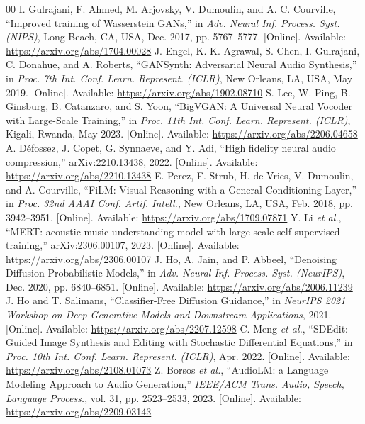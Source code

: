 \documentclass[conference]{IEEEtran}
\begin{document}
\begin{thebibliography}{00}
 I. Gulrajani, F. Ahmed, M. Arjovsky, V. Dumoulin, and A. C. Courville, ``Improved training of Wasserstein GANs,'' in \textit{Adv. Neural Inf. Process. Syst. (NIPS)}, Long Beach, CA, USA, Dec. 2017, pp. 5767--5777. [Online]. Available: \url{https://arxiv.org/abs/1704.00028}
 J. Engel, K. K. Agrawal, S. Chen, I. Gulrajani, C. Donahue, and A. Roberts, ``GANSynth: Adversarial Neural Audio Synthesis,'' in \textit{Proc. 7th Int. Conf. Learn. Represent. (ICLR)}, New Orleans, LA, USA, May 2019. [Online]. Available: \url{https://arxiv.org/abs/1902.08710}
 S. Lee, W. Ping, B. Ginsburg, B. Catanzaro, and S. Yoon, ``BigVGAN: A Universal Neural Vocoder with Large-Scale Training,'' in \textit{Proc. 11th Int. Conf. Learn. Represent. (ICLR)}, Kigali, Rwanda, May 2023. [Online]. Available: \url{https://arxiv.org/abs/2206.04658}
 A. D\'efossez, J. Copet, G. Synnaeve, and Y. Adi, ``High fidelity neural audio compression,'' arXiv:2210.13438, 2022. [Online]. Available: \url{https://arxiv.org/abs/2210.13438}
 E. Perez, F. Strub, H. de Vries, V. Dumoulin, and A. Courville, ``FiLM: Visual Reasoning with a General Conditioning Layer,'' in \textit{Proc. 32nd AAAI Conf. Artif. Intell.}, New Orleans, LA, USA, Feb. 2018, pp. 3942--3951. [Online]. Available: \url{https://arxiv.org/abs/1709.07871}
 Y. Li \textit{et al.}, ``MERT: acoustic music understanding model with large-scale self-supervised training,'' arXiv:2306.00107, 2023. [Online]. Available: \url{https://arxiv.org/abs/2306.00107}
 J. Ho, A. Jain, and P. Abbeel, ``Denoising Diffusion Probabilistic Models,'' in \textit{Adv. Neural Inf. Process. Syst. (NeurIPS)}, Dec. 2020, pp. 6840--6851. [Online]. Available: \url{https://arxiv.org/abs/2006.11239}
 J. Ho and T. Salimans, ``Classifier-Free Diffusion Guidance,'' in \textit{NeurIPS 2021 Workshop on Deep Generative Models and Downstream Applications}, 2021. [Online]. Available: \url{https://arxiv.org/abs/2207.12598}
 C. Meng \textit{et al.}, ``SDEdit: Guided Image Synthesis and Editing with Stochastic Differential Equations,'' in \textit{Proc. 10th Int. Conf. Learn. Represent. (ICLR)}, Apr. 2022. [Online]. Available: \url{https://arxiv.org/abs/2108.01073}
 Z. Borsos \textit{et al.}, ``AudioLM: a Language Modeling Approach to Audio Generation,'' \textit{IEEE/ACM Trans. Audio, Speech, Language Process.}, vol. 31, pp. 2523--2533, 2023. [Online]. Available: \url{https://arxiv.org/abs/2209.03143}
\end{thebibliography}
\end{document}
